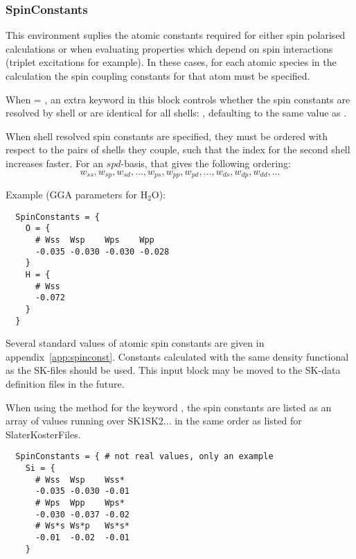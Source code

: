 \subsubsection{SpinConstants}
\label{sec:dftbp.SpinConstants}

This environment suplies the atomic constants required for either spin polarised
calculations or when evaluating properties which depend on spin interactions
(triplet excitations for example).  In these cases, for each atomic species in
the calculation the spin coupling constants for that atom must be specified.

When  = , an extra keyword in this block controls
whether the spin constants are resolved by shell or are identical for all
shells: , defaulting to the same value as
.

When shell resolved spin constants are specified, they must be ordered with
respect to the pairs of shells they couple, such that the index for the second
shell increases faster. For an $spd$-basis, that gives the following ordering:
\begin{equation*}
  w_{ss}, w_{sp}, w_{sd}, \dots,
  w_{ps}, w_{pp}, w_{pd}, \dots,
  w_{ds}, w_{dp}, w_{dd}, \dots
\end{equation*}

Example (GGA parameters for H$_2$O):
\begin{verbatim}
  SpinConstants = {
    O = {
      # Wss  Wsp    Wps    Wpp
      -0.035 -0.030 -0.030 -0.028
    }
    H = {
      # Wss
      -0.072
    }
  }
\end{verbatim}

Several standard values of atomic spin constants are given in
appendix~\ref{app:spinconst}. Constants calculated with the same
density functional as the SK-files should be used. This input block
may be moved to the SK-data definition files in the future.

When using the  method for the keyword
, the spin constants are listed as an array of
values running over $\text{SK1}\text{SK2}\ldots$ in the same order as
listed for SlaterKosterFiles.

\begin{verbatim}
  SpinConstants = { # not real values, only an example
    Si = {
      # Wss  Wsp    Wss*
      -0.035 -0.030 -0.01
      # Wps  Wpp    Wps*
      -0.030 -0.037 -0.02
      # Ws*s Ws*p   Ws*s*
      -0.01  -0.02  -0.01
    }
\end{verbatim}

